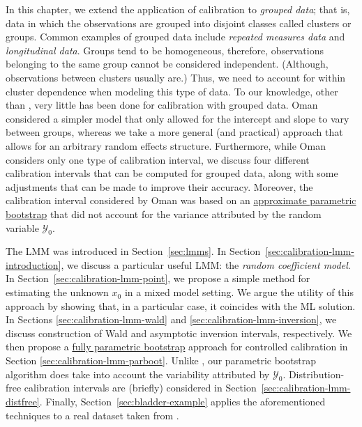 \documentclass[cmfont,usenames,dvipsnames,leqno]{afit-etd}\usepackage[]{graphicx}\usepackage[]{color}
\newcommand{\mc}[1]{\ensuremath{\mathcal{#1}}}
\begin{document}
In this chapter, we extend the application of calibration to \textit{grouped data}; that is, data in which the observations are grouped into disjoint classes called clusters or groups. Common examples of grouped data include \textit{repeated measures data} and \textit{longitudinal data}. Groups tend to be homogeneous, therefore, observations belonging to the same group cannot be considered independent. (Although, observations between clusters usually are.) Thus, we need to account for within cluster dependence when modeling this type of data. To our knowledge, other than \citet{oman_calibration_1998}, very little has been done for calibration with grouped data. Oman considered a simpler model that only allowed for the intercept and slope to vary between groups, whereas we take a more general (and practical) approach that allows for an arbitrary random effects structure. Furthermore, while Oman considers only one type of calibration interval, we discuss four different calibration intervals that can be computed for grouped data, along with some adjustments that can be made to improve their accuracy. Moreover, the calibration interval considered by Oman was based on an \underline{approximate parametric bootstrap} that did not account for the variance attributed by the random variable $\mc{Y}_0$.

The LMM was introduced in Section~\ref{sec:lmms}. In Section~\ref{sec:calibration-lmm-introduction}, we discuss a particular useful LMM: the \textit{random coefficient model}. In Section~\ref{sec:calibration-lmm-point}, we propose a simple method for estimating the unknown $x_0$ in a mixed model setting. We argue the utility of this approach by showing that, in a particular case, it coincides with the ML solution. In Sections \ref{sec:calibration-lmm-wald} and \ref{sec:calibration-lmm-inversion}, we discuss construction of Wald and asymptotic inversion intervals, respectively. We then propose a \underline{fully parametric bootstrap} approach for controlled calibration in Section \ref{sec:calibration-lmm-parboot}. Unlike \citet{oman_calibration_1998}, our parametric bootstrap algorithm does take into account the variability attributed by $\mc{Y}_0$. Distribution-free calibration intervals are (briefly) considered in Section~\ref{sec:calibration-lmm-distfree}. Finally, Section~\ref{sec:bladder-example} applies the aforementioned techniques to a real dataset taken from \citet{brown_measurement_1993}.
\end{document}
